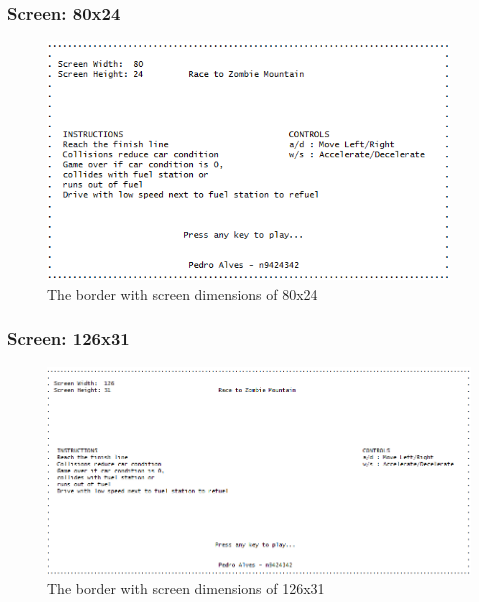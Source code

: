 \documentclass{article}
\begin{document}
\subsubsection*{Screen: 80x24}
\begin{figure}[h]
	\begin{center}
	\includegraphics[width=0.95\textwidth]{images/border_80x24}
	\caption{The border with screen dimensions of 80x24}
	\label{fig:border_80x24} 
	\end{center}
\end{figure}
\subsubsection*{Screen: 126x31}
\begin{figure}[h]
	\begin{center}
	\includegraphics[width=1\textwidth]{images/border_126x31}
	\caption{The border with screen dimensions of 126x31}
	\label{fig:border_126x31} 
	\end{center}
\end{figure}
\end{document}

